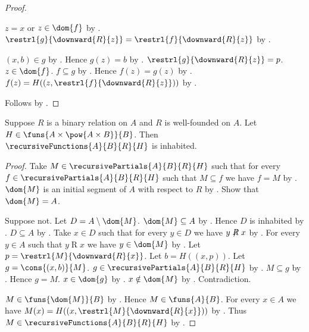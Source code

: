 \begin{proof}
\begin{subproof}
        $z=x$ or $z\in\dom{f}$ by .
        $\restrl{g}{\downward{R}{z}}=\restrl{f}{\downward{R}{z}}$
            by .
        \begin{byCase}
                $(x,b)\in g$ by .
                Hence $g(z)=b$ by .
                $\restrl{g}{\downward{R}{z}}=p$.
                $z\in\dom{f}$.
                $f\subseteq g$ by .
                Hence $f(z)=g(z)$ by .
                $f(z)=H((z,\restrl{f}{\downward{R}{z}}))$
                    by .
        \end{byCase}
    \end{subproof}
    Follows by .
\end{proof}

\begin{theorem}\label{bounded_well_founded_recursion_exists}
    Suppose $R$ is a binary relation on $A$ and $R$ is well-founded on $A$.
    Let $H\in\funs{A\times\pow{A\times B}}{B}$.
    Then $\recursiveFunctions{A}{B}{R}{H}$ is inhabited.
\end{theorem}
\begin{proof}
    Take $M\in\recursivePartials{A}{B}{R}{H}$ such that
        for every $f\in\recursivePartials{A}{B}{R}{H}$ such that
            $M\subseteq f$ we have $f=M$
        by .
    $\dom{M}$ is an initial segment of $A$ with respect to $R$
        by .
    Show that $\dom{M}=A$.
    \begin{subproof}
        Suppose not.
        Let $D=A\setminus\dom{M}$.
        $\dom{M}\subseteq A$ by .
        Hence $D$ is inhabited
            by .
        $D\subseteq A$ by .
        Take $x\in D$ such that for every $y\in D$ we have $y\not\mathrel{R}x$
            by .
        For every $y\in A$ such that $y\mathrel{R}x$ we have $y\in\dom{M}$
            by .
        Let $p=\restrl{M}{\downward{R}{x}}$.
        Let $b=H((x,p))$.
        Let $g=\cons{(x,b)}{M}$.
        $g\in\recursivePartials{A}{B}{R}{H}$
            by .
        $M\subseteq g$ by .
        Hence $g=M$.
        $x\in\dom{g}$ by .
        $x\notin\dom{M}$ by .
        Contradiction.
    \end{subproof}
    $M\in\funs{\dom{M}}{B}$ by .
    Hence $M\in\funs{A}{B}$.
    For every $x\in A$ we have
        $M(x)=H((x,\restrl{M}{\downward{R}{x}}))$
        by .
    Thus $M\in\recursiveFunctions{A}{B}{R}{H}$
        by .
\end{proof}

